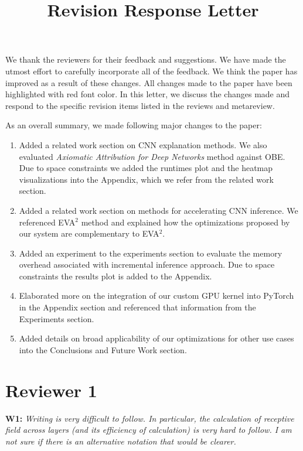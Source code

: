 \documentclass[preprint]{vldb}
\title{Revision Response Letter}
\author{}
\begin{document}
\maketitle

We thank the reviewers for their feedback and suggestions. We have made the utmost effort to carefully incorporate all of the feedback. 
We think the paper has improved as a result of these changes.
All changes made to the paper have been highlighted with red font color.
In this letter, we discuss the changes made and respond to the specific revision items listed in the reviews and metareview. 

As an overall summary, we made following major changes to the paper:
\begin{enumerate}
	\item Added a related work section on CNN explanation methods. We also evaluated \textit{Axiomatic Attribution for Deep Networks} method against OBE. Due to space constraints we added the runtimes plot and the heatmap visualizations into the Appendix, which we refer from the related work section.
	\item Added a related work section on methods for accelerating CNN inference. We referenced EVA$^2$ method and explained how the optimizations proposed by our system are complementary to EVA$^2$.
	\item Added an experiment to the experiments section to evaluate the memory overhead associated with incremental inference approach. Due to space constraints the results plot is added to the Appendix.
	\item Elaborated more on the integration of our custom GPU kernel into PyTorch in the Appendix section and referenced that information from the Experiments section.
	\item Added details on broad applicability of our optimizations for other use cases into the Conclusions and Future Work section.
\end{enumerate}

\section{Reviewer 1}

\vspace{2mm}
\noindent \textbf{W1:} \textit{Writing is very difficult to follow. In particular, the calculation of receptive field across layers (and its efficiency of calculation) is very hard to follow. I am not sure if there is an alternative notation that would be clearer.}
\end{document}
